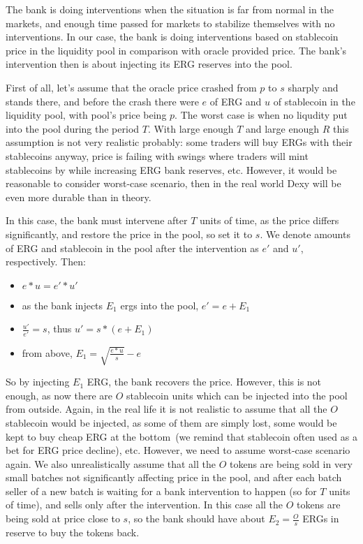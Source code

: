 \documentclass{article}   %
\newcommand{\bc}{ERG}
\newcommand{\sct}{stablecoin}
\newcommand{\dx}{Dexy}
\begin{document}
The bank is doing interventions when the situation is far from normal in the markets, and enough time passed for markets to stabilize themselves with no interventions. In our case, the bank is doing interventions based on stablecoin price in the liquidity pool in comparison with oracle provided price. The bank's intervention then is about injecting its \bc{} reserves into the pool.  

First of all, let's assume that the oracle price crashed from $p$ to $s$ sharply and stands there, and before the crash there were $e$ of \bc{} and $u$ of \sct{} in the liquidity pool, with pool's price being $p$. The worst case is when no liqudity put into the pool during the period $T$. With large enough $T$ and large enough $R$ this assumption is not very realistic probably: some traders will buy \bc{}s with their \sct{}s anyway, price is failing with swings where traders will mint \sct{}s by while increasing \bc{} bank reserves, etc. However, it would be reasonable to consider worst-case scenario, then in the real world \dx{} will be even more durable than in theory. 

In this case, the bank must intervene after $T$ units of time, as the price differs significantly, and restore the price in the pool, so set it to $s$. We denote amounts of \bc{} and \sct{} in the pool after the intervention as $e'$ and $u'$, respectively. Then:

\begin{itemize}
  \item{} $e * u = e' * u'$
  \item{} as the bank injects $E_1$ ergs into the pool, $e' = e + E_1$
  \item{} $\frac{u'}{e'} = s$, thus $u' = s * (e + E_1)$ 
  \item{} from above, $E_1 = \sqrt{\frac{e * u}{s}} - e$
\end{itemize}

So by injecting $E_1$ \bc{}, the bank recovers the price. However, this is not enough, as now there are $O$ \sct{} units which can be injected into the pool from outside. 
Again, in the real life it is not realistic to assume that all the $O$ \sct{} would be injected, as some of them are simply lost, some would be kept to buy cheap ERG at the bottom~(we remind that \sct{} often used as a bet for \bc{} price decline), etc. However, we need to assume worst-case scenario again. We also unrealistically assume that all the $O$ tokens are being sold in very small batches not significantly affecting price in the pool, and after each batch seller of a new batch is waiting for a bank intervention to happen (so for $T$ units of time), and sells only after the intervention. In this case all the $O$ tokens are being sold at price close to $s$, so the bank should have about $E_2 = \frac{O}{s}$ \bc{}s in reserve to buy the tokens back.
\end{document}

